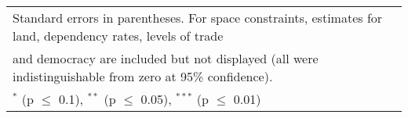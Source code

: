 \begin{table}[htbp]
\begin{tabular}{l*{5}{c}}
\hline\hline
\multicolumn{6}{l}{\footnotesize Standard errors in parentheses. For space constraints, estimates for land, dependency rates, levels of trade}\\
\multicolumn{6}{l}{\footnotesize and democracy are included but not displayed (all were indistinguishable from zero at 95\% confidence).}\\
\multicolumn{6}{l}{\footnotesize $^{*}$ (p $\le$ 0.1), $^{**}$ (p $\le$ 0.05), $^{***}$ (p $\le$ 0.01)}\\
\end{tabular}
\end{table}
